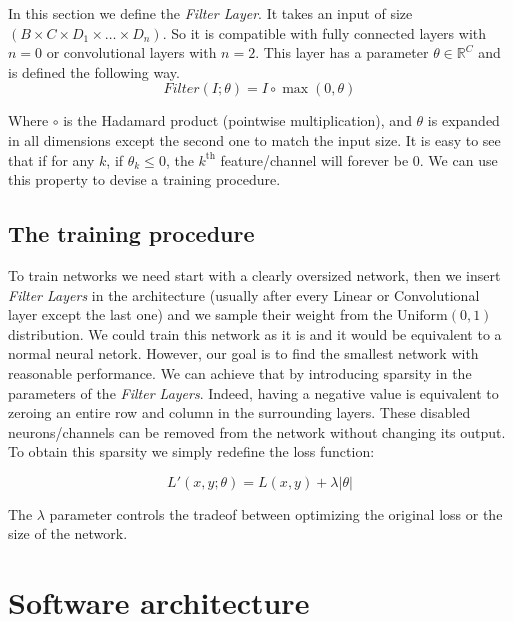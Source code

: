 \documentclass[sigconf]{acmart}
\begin{document}
In this section we define the \textit{Filter Layer}. It takes an input of size $\left(B \times C \times D_1 \times \dots \times D_n\right)$. So it is compatible with fully connected layers with $n=0$ or convolutional layers with $n=2$. This layer has a parameter $\theta \in \mathbb{R}^C$ and is defined the following way.
\begin{equation}
  Filter(I;\theta) = I \circ \max(0, \theta)
\end{equation}

Where $\circ$ is the Hadamard product (pointwise multiplication), and $\theta$ is expanded in all dimensions except the second one to match the input size. It is easy to see that if for any $k$, if $\theta_k \leq 0$, the $k^{\text{th}}$ feature/channel will forever be $0$. We can use this property to devise a training procedure.
\subsection{The training procedure}

To train networks we need start with a clearly oversized network, then we insert \textit{Filter Layers} in the architecture (usually after every Linear or Convolutional layer except the last one) and we sample their weight from the $\text{Uniform}(0, 1)$ distribution. We could train this network as it is and it would be equivalent to a normal neural netork. However, our goal is to find the smallest network with reasonable performance. We can achieve that by introducing sparsity in the parameters of the \textit{Filter Layers}. Indeed, having a negative value is equivalent to zeroing an entire row and column in the surrounding layers. These disabled neurons/channels can be removed from the network without changing its output. To obtain this sparsity we simply redefine the loss function:

\begin{equation}
  L'(x,y;\theta) = L(x, y) + \lambda|\theta|
\end{equation}

The $\lambda$ parameter controls the tradeof between optimizing the original loss or the size of the network.

\section{Software architecture}
\end{document}
